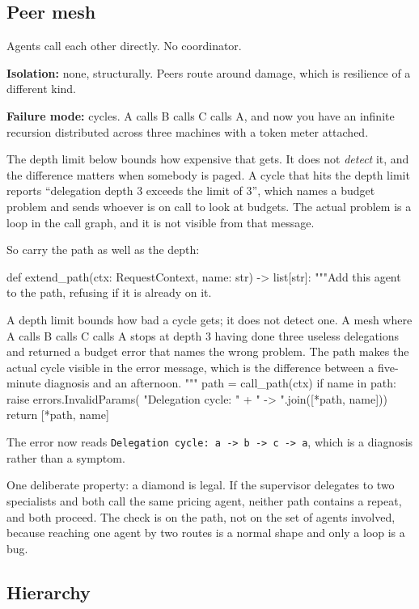 \subsection{Peer mesh}

Agents call each other directly. No coordinator.

\textbf{Isolation:} none, structurally. Peers route around damage, which is
resilience of a different kind.

\textbf{Failure mode:} cycles. A calls B calls C calls A, and now you have an
infinite recursion distributed across three machines with a token meter attached.

The depth limit below bounds how expensive that gets. It does not \emph{detect}
it, and the difference matters when somebody is paged. A cycle that hits the
depth limit reports ``delegation depth 3 exceeds the limit of 3'', which names a
budget problem and sends whoever is on call to look at budgets. The actual
problem is a loop in the call graph, and it is not visible from that message.

So carry the path as well as the depth:

\begin{py}
def extend_path(ctx: RequestContext, name: str) -> list[str]:
    """Add this agent to the path, refusing if it is already on it.

    A depth limit bounds how bad a cycle gets; it does not detect one. A mesh
    where A calls B calls C calls A stops at depth 3 having done three useless
    delegations and returned a budget error that names the wrong problem. The
    path makes the actual cycle visible in the error message, which is the
    difference between a five-minute diagnosis and an afternoon.
    """
    path = call_path(ctx)
    if name in path:
        raise errors.InvalidParams(
            "Delegation cycle: " + " -> ".join([*path, name]))
    return [*path, name]
\end{py}

The error now reads \texttt{Delegation cycle: a -> b -> c -> a}, which is a
diagnosis rather than a symptom.

One deliberate property: a diamond is legal. If the supervisor delegates to two
specialists and both call the same pricing agent, neither path contains a
repeat, and both proceed. The check is on the path, not on the set of agents
involved, because reaching one agent by two routes is a normal shape and only a
loop is a bug.

\subsection{Hierarchy}


